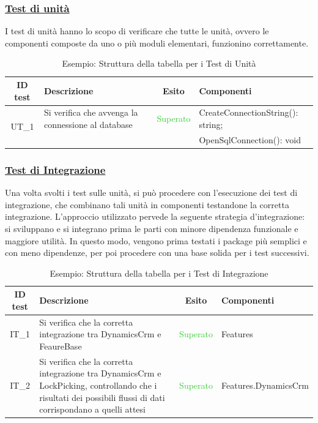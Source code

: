 \subsubsection{\underline{Test di unità}}
I test di unità hanno lo scopo di verificare che tutte le unità, ovvero le componenti composte da uno o più moduli elementari, funzionino correttamente.
\begin{table}[H]
\begin{tabularx}{\textwidth}{|c|X|c|X|}
	\hline
	\rowcolor{aliceblue}
	{ID test} & {Descrizione}  & {Esito} & {Componenti} \\ \hline
	\multirow{ 2}{*}{UT\_1} & {Si verifica che avvenga la connessione al database}  & {\textcolor{limegreen}{Superato}} & { CreateConnectionString(): string;} \\ & &  & {OpenSqlConnection(): void }  \\
	\hline
\end{tabularx}
    \caption {Esempio: Struttura della tabella per i Test di Unità \label{fig:tableUT}}	
\end{table}
\clearpage
\subsubsection{\underline{Test di Integrazione}}
Una volta svolti i test sulle unità, si può procedere con l’esecuzione dei test di integrazione, che combinano tali unità in componenti testandone la corretta integrazione.
L'approccio  utilizzato pervede la seguente strategia d’integrazione: si sviluppano e si integrano prima le parti con minore dipendenza funzionale e maggiore utilità. In questo modo, vengono prima testati i package più semplici e con meno dipendenze, per poi procedere con una base solida per i test successivi.
\begin{table}[H]
\begin{tabularx}{\textwidth}{|c|X|c|X|}
	\hline
	\rowcolor{aliceblue}
	{ID test} & {Descrizione}  & {Esito} & {Componenti} \\ \hline
	{IT\_1} & {Si verifica che la corretta integrazione tra DynamicsCrm e FeaureBase}  & {\textcolor{limegreen}{Superato}} & {Features} \\
	\hline
	{IT\_2} & {Si verifica che la corretta integrazione tra DynamicsCrm e LockPicking, controllando che i risultati dei possibili flussi di dati corrispondano a quelli attesi}  & {\textcolor{limegreen}{Superato}}  & {Features.DynamicsCrm} \\ 
	\hline
\end{tabularx}
    \caption {Esempio: Struttura della tabella per i Test di Integrazione \label{fig:tableIT}}	
\end{table}

